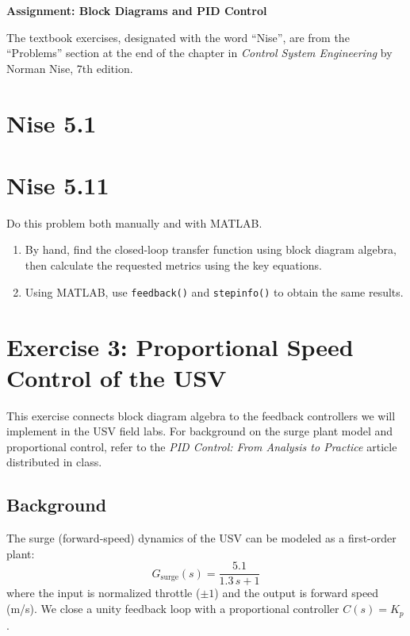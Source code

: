 \documentclass[11pt]{article}
\begin{document}
\begin{center}
  \Large{\bf{Assignment: Block Diagrams and PID Control}}
\end{center}

The textbook exercises, designated with the word ``Nise'', are from the
``Problems'' section at the end of the chapter in \emph{Control System
Engineering} by Norman Nise, 7th edition.

\section*{Nise 5.1}

\section*{Nise 5.11}

Do this problem both manually and with MATLAB.

\begin{enumerate}
\item By hand, find the closed-loop transfer function using block diagram
  algebra, then calculate the requested metrics using the key equations.
\item Using MATLAB, use \texttt{feedback()} and \texttt{stepinfo()} to obtain
  the same results.
\end{enumerate}

\section*{Exercise 3: Proportional Speed Control of the USV}

This exercise connects block diagram algebra to the feedback controllers
we will implement in the USV field labs.
For background on the surge plant model and proportional control,
refer to the \emph{PID Control: From Analysis to Practice} article distributed
in class.

\subsection*{Background}

The surge (forward-speed) dynamics of the USV can be modeled as a first-order
plant:
\[
  G_{\mathrm{surge}}(s) = \frac{5.1}{1.3\,s + 1}
\]
where the input is normalized throttle ($\pm 1$) and the output is forward
speed (m/s).
We close a unity feedback loop with a proportional controller $C(s) = K_p$.
\end{document}
